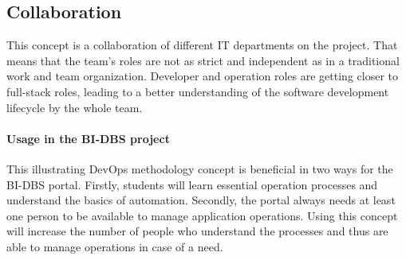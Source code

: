 \subsection{Collaboration} This concept is a collaboration of different IT departments on the project. That means that the team's roles are not as strict and independent as in a traditional work and team organization. Developer and operation roles are getting closer to full-stack roles, leading to a better understanding of the software development lifecycle by the whole team.

\paragraph*{Usage in the BI-DBS project} This illustrating DevOps methodology concept is beneficial in two ways for the BI-DBS portal. Firstly, students will learn essential operation processes and understand the basics of automation. Secondly, the portal always needs at least one person to be available to manage application operations. Using this concept will increase the number of people who understand the processes and thus are able to manage operations in case of a need.







